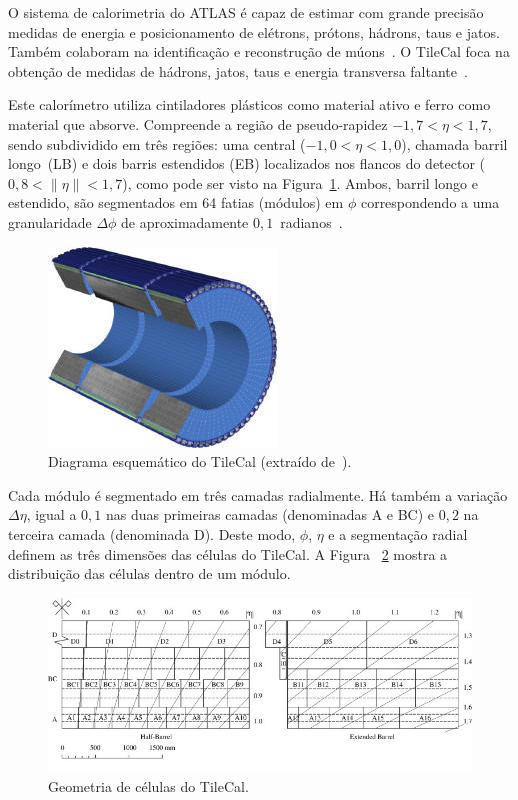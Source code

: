 O sistema de calorimetria do ATLAS é capaz de estimar com grande precisão
medidas de energia e posicionamento de elétrons, prótons, hádrons, taus e jatos.
Também colaboram na identificação e reconstrução de
múons~\cite{AAD2010READINESS}. O TileCal foca na obtenção de medidas de
hádrons, jatos, taus e energia transversa faltante~\cite{MERMOD2008}.

Este calorímetro utiliza cintiladores plásticos como material ativo e ferro
como material que absorve. Compreende a região de pseudo-rapidez $-1,7 < \eta <
1,7$, sendo subdividido em três regiões: uma central  ($-1,0 < \eta < 1,0$),
chamada barril longo~(LB) e dois barris estendidos (EB) localizados nos flancos
do detector ( $0,8 < \|\eta\| < 1,7$), como pode ser visto na
Figura~\ref{fig:tilecalschema}. Ambos, barril longo e estendido, são
segmentados em 64 fatias (módulos) em $\phi$ correspondendo a uma granularidade
$\Delta\phi$ de aproximadamente $0,1$~radianos~\cite{DETECTOR1996TECHNICAL}.

\begin{figure}[htpb!]
    \centering
    \includegraphics{images/TILECAL_modules_schema.jpg}
    \caption[Diagrama esquemático do TileCal]{Diagrama esquemático do TileCal (extraído
    de~\cite{ref:atlas_www}).}
    \label{fig:tilecalschema}
\end{figure}

Cada módulo é segmentado em três camadas radialmente. Há também a variação
$\Delta\eta$,  igual a $0,1$ nas duas primeiras camadas (denominadas A e BC) e
$0,2$ na terceira camada (denominada D). Deste modo, $\phi$, $\eta$ e a
segmentação radial definem as três dimensões das células do TileCal.  A Figura
~\ref{fig:tilecalgeometry} mostra a distribuição das células dentro de um
módulo.

\begin{figure}[htpb!]
    \centering
    \includegraphics[width=\textwidth]{images/tile_geometry.jpg}
    \caption[Geometria de células do TileCal]{Geometria de células do TileCal.}
    \label{fig:tilecalgeometry}
\end{figure}


